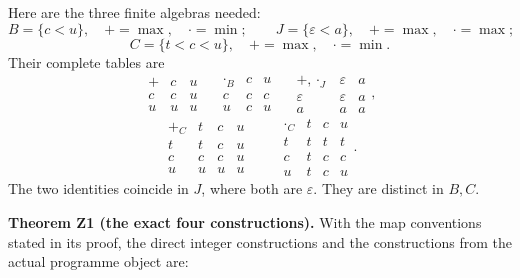 \documentclass[
]{article}
\begin{document}
Here are the three finite algebras needed: \[
B=\{c<u\},\quad +=\max,\quad\cdot=\min;
\qquad J=\{\varepsilon<a\},\quad +=\max,\quad\cdot=\max;
\] \[
C=\{t<c<u\},\quad +=\max,\quad\cdot=\min.
\tag{Z3}
\] Their complete tables are \[
\begin{array}{c|cc}+&c&u\\\hline c&c&u\\u&u&u\end{array}
\quad
\begin{array}{c|cc}\cdot_B&c&u\\\hline c&c&c\\u&c&u\end{array}
\quad
\begin{array}{c|cc}+,\cdot_J&\varepsilon&a\\\hline
\varepsilon&\varepsilon&a\\a&a&a\end{array},
\tag{Z4}
\] \[
\begin{array}{c|ccc}+_C&t&c&u\\\hline
t&t&c&u\\c&c&c&u\\u&u&u&u\end{array}
\qquad
\begin{array}{c|ccc}\cdot_C&t&c&u\\\hline
t&t&t&t\\c&t&c&c\\u&t&c&u\end{array}.
\tag{Z5}
\] The two identities coincide in \(J\), where both are \(\varepsilon\).
They are distinct in \(B,C\).

\textbf{Theorem Z1 (the exact four constructions).} With the map
conventions stated in its proof, the direct integer constructions and
the constructions from the actual programme object are:
\end{document}
